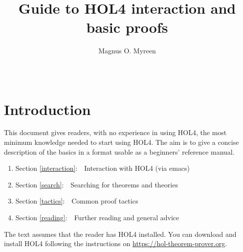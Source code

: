 \documentclass[a4paper,10pt]{article}
\begin{document}
\title{\bf\Large Guide to HOL4 interaction and basic proofs\vspace{-0.3em}}

\author{\normalsize Magnus O. Myreen}
\date{~\vspace{-2em}}

\maketitle

\newenvironment{code}{\begin{quote}%
\begin{alltt}\small}{%
\end{alltt}%
\end{quote}}
\newenvironment{enum}{\begin{enumerate}
\setlength{\itemsep}{-\parsep}
}{\end{enumerate}}

\renewcommand{\conj}{\(\begin{array}{c}\texttt{\bf\scriptsize/\textbackslash}\\[0.18em]\end{array}\)}
\newcommand{\mysec}[1]{\section{\large #1}}
\newcommand{\mysubsec}[1]{\subsection{\normalsize#1}}

\mysec{Introduction}

This document gives readers, with no experience in using HOL4, the most
minimum knowledge needed to start using HOL4. The aim is to give a
concise description of the basics in a format usable as a beginners'
reference manual.
\begin{enum}
\item[~] Section \ref{interaction}:~~Interaction with HOL4 (via emacs)
\item[~] Section \ref{search}:~~Searching for theorems and theories
\item[~] Section \ref{tactics}:~~Common proof tactics
\item[~] Section \ref{reading}:~~Further reading and general advice
\end{enum}
The text assumes that the reader has HOL4 installed. You can download and install HOL4 following the instructions on \url{https://hol-theorem-prover.org}.
\end{document}
